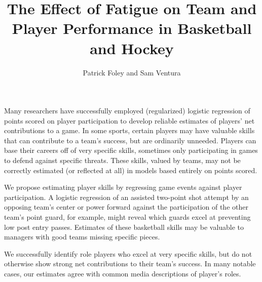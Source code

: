 \documentclass{article}
\author{Patrick Foley and Sam Ventura}
\title{The Effect of Fatigue on Team and Player Performance in Basketball and Hockey}
\begin{document}
\maketitle{}

Many researchers have successfully employed (regularized) logistic regression of points scored on player participation to develop reliable estimates of players’ net contributions to a game.  In some sports, certain players may have valuable skills that can contribute to a team’s success, but are ordinarily unneeded.  Players can base their careers off of very specific skills, sometimes only participating in games to defend against specific threats.  These skills, valued by teams, may not be correctly estimated (or reflected at all) in models based entirely on points scored.

We propose estimating player skills by regressing game events against player participation.  A logistic regression of an assisted two-point shot attempt by an opposing team’s center or power forward against the participation of the other team’s point guard, for example, might reveal which guards excel at preventing low post entry passes.  Estimates of these basketball skills may be valuable to managers with good teams missing specific pieces.  

We successfully identify role players who excel at very specific skills, but do not otherwise show strong net contributions to their team’s success.  In many notable cases, our estimates agree with common media descriptions of player’s roles.  
\end{document}
